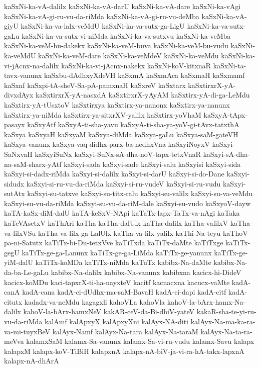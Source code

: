 {kaSxNi-ka-vA-dalilx
kaSxNi-ka-vA-darU
kaSxNi-ka-vA-dare
kaSxNi-ka-vAgi
kaSxNi-ka-vA-gi-ru-vu-da-riMda
kaSxNi-ka-vA-gi-ru-vu-deMba
kaSxNi-ka-vA-giyU
kaSxNi-ka-va-lalx-veMdU
kaSxNi-ka-va-sutx-ga-LigU
kaSxNi-ka-va-sutx-gaLu
kaSxNi-ka-va-sutx-vi-niMda
kaSxNi-ka-va-sutxvu
kaSxNi-ka-veMba
kaSxNi-ka-veM-bu-dakekx
kaSxNi-ka-veM-buva
kaSxNi-ka-veM-bu-vudu
kaSxNi-ka-veMdU
kaSxNi-ka-veM-dare
kaSxNi-ka-veMdeV
kaSxNi-ka-veMdu
kaSxNi-ka-vi-jAcnx-na-dalilx
kaSxNi-ka-vi-jAcnx-nakekx
kaSxNi-koV-kitxnaR
kaSxNi-ta-tavx-vanunx
kaSxbu-dAdhxyXdeVH
kaSxmA
kaSxmAca
kaSxmaH
kaSxmamf
kaSxnf
kaSxpi-tA-sheV-Sa-pA-pamxnaH
kaSxreV
kaSxtarx
kaSxtirxrX-yA-divxdAyx
kaSxtirxrX-yA-nasxdA
kaSxtirxrX-yAyAM
kaSxtirx-yA-di-ga-LeMdu
kaSxtirx-yA-tUsxtoV
kaSxtirxya
kaSxtirx-ya-nanonx
kaSxtirx-ya-nanunx
kaSxtirx-ya-niMda
kaSxtirx-ya-sitxrXV-yalilx
kaSxtirx-yoVhaM
kaSxyA-tApx-pasayx
kaSxyAtf
kaSxyA-ti-sha-yavu
kaSxyA-ti-sha-ya-yoV-gi-tAvx-tatxthA
kaSxya
kaSxyaH
kaSxyaM
kaSxya-diMda
kaSxya-gaLu
kaSxya-saM-gateVH
kaSxya-vanunx
kaSxya-vaq-didhx-parx-ba-nedhxVna
kaSxyiNoyxV
kaSxyi-SaNxvaH
kaSxyiSuNx
kaSxyi-SuNx-sA-dha-noV-tapx-tetxVnaR
kaSxyi-sA-dha-na-saM-sharx-yAtf
kaSxyi-sada
kaSxyi-sade
kaSxyi-salu
kaSxyisi
kaSxyi-sida
kaSxyi-si-dadx-riMda
kaSxyi-si-dalilx
kaSxyi-si-darU
kaSxyi-si-do-Dane
kaSxyi-sidudx
kaSxyi-si-ru-vu-da-riMda
kaSxyi-si-ru-vudeV
kaSxyi-si-ru-vudu
kaSxyi-sutAtx
kaSxyi-su-tatxve
kaSxyi-su-titx-ralu
kaSxyi-su-valilx
kaSxyi-su-va-veMdu
kaSxyi-su-vu-da-riMda
kaSxyi-su-vu-da-riM-dale
kaSxyi-su-vudo
kaSxyoV-dayw
kaTA-kaSx-diM-dalU
kaTA-keSxV-NApi
kaTaTx-lapx-TaTx-va-nAgi
kaTaka
kaTeVAsetxV
kaThAri
kaTha
kaTha-dalUlx
kaTha-dalilx
kaTha-valilxV
kaTha-va-lilxVSu
kaTha-va-lilx-ga-LalUlx
kaTha-va-lilx-yalilx
kaThi-Na-teyu
kaThoV-pa-ni-Satutx
kaTiTx-bi-Du-tetxVve
kaTiTxda
kaTiTx-daMte
kaTiTxge
kaTiTx-gegU
kaTiTx-ge-ga-Lanunx
kaTiTx-ge-ga-LiMda
kaTiTx-ge-yanunx
kaTiTx-ge-yiM-dalU
kaTiTx-koMDa
kaTiTx-niMda
kaTuTx
kabibx-Na-daMte
kabibx-Na-da-ba-Le-gaLu
kabibx-Na-dalilx
kabibx-Na-vanunx
kabibxna
kacicx-hi-DideV
kacicx-koMDu
kaci-tapxrX-ti-ha-nayxteV
kacitf
kacnacxna
kacucx-vaMte
kadA-canA
kadA-cana
kadA-ci-dUdhx-ma-saM-BavaH
kadA-ci-dapi
kadA-citf
kadA-citutx
kadadx-va-neMdu
kagagxli
kahoVLa
kahoVla
kahoV-la-bArx-hamx-Na-dalilx
kahoV-la-bArx-hamxNeV
kakAR-ceV-da-Bi-dhiV-yateV
kakaR-sha-te-yi-ru-vu-da-riMda
kalAmf
kalApxyX
kalApxyXni
kalAyx-NA-diti
kalAyx-Na-ma-ka-ra-va-mi-tuyxBeV
kalAyx-Namf
kalAyx-Na-tara
kalAyx-Na-taraM
kalAyx-Na-ta-ra-meVva
kalamxSaM
kalamx-Sa-vanunx
kalamx-Sa-vi-ru-vudu
kalamx-Savu
kalapx
kalapxM
kalapx-koV-TiBiH
kalapxnA
kalapx-nA-biV-ja-vi-ra-hA-takx-lapxnA
kalapx-nA-dhArA
}
